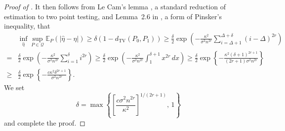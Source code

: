 \documentclass{article}
\begin{document}
\begin{proof}[Proof of ]
It then follows from Le Cam's lemma \citep[e.g.][]{yu1997assouad}, a standard reduction of estimation to two point testing, and Lemma~2.6 in \cite{Tsybakov2009}, a form of Pinsker's inequality, that
	\begin{align*}
		& \inf_{\widehat{\eta}} \sup_{P \in \mathcal{Q}} \mathbb{E}_P(|\widehat{\eta} - \eta|) \geq \delta (1 - d_{\mathrm{TV}}(P_0, P_1)) \geq \frac{\delta}{2} \exp\left( -\frac{\kappa^2}{\sigma^2 n^{2r}} \sum_{i = \Delta + 1}^{\Delta + \delta}(i - \Delta)^{2r} \right) \\
		= & \frac{\delta}{2} \exp\left( -\frac{\kappa^2}{\sigma^2 n^{2r}} \sum_{i = 1}^{\delta}i^{2r} \right) \geq \frac{\delta}{2} \exp\left( -\frac{\kappa^2}{\sigma^2 n^{2r}} \int_1^{\delta + 1} x^{2r}\,dx \right) \geq \frac{\delta}{2} \exp\left\{ -\frac{\kappa^2 (\delta+1)^{2r+1}}{(2r+1)\sigma^2n^{2r}}  \right\}\\
		\geq & \frac{\delta}{2} \exp\left\{-\frac{c\kappa^2\delta^{2r+1}}{\sigma^2 n^{2r}} \right\}.
	\end{align*}
	We set 
	\[
		\delta = \max\left\{\left[\frac{c \sigma^2 n^{2r}}{\kappa^2}\right]^{1/(2r+1)},\, 1\right\}
	\]
	and complete the proof.
\end{proof}
\end{document}
